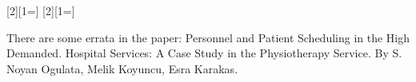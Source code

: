 \documentclass[a4paper,12pt]{article}
\begin{document}
\clearpage
{}
\setcounter{page}{1}

\tableofcontents






\clearpage
{}
\setcounter{page}{1}


%
[2][1=]{}
[2][1=]{}
%
%




There are some errata in the paper: Personnel and Patient Scheduling in the High Demanded. Hospital Services: A Case Study in the Physiotherapy Service. By S. Noyan Ogulata, Melik Koyuncu, Esra Karakas\cite{ogulata2008personnel}.
\end{document}
